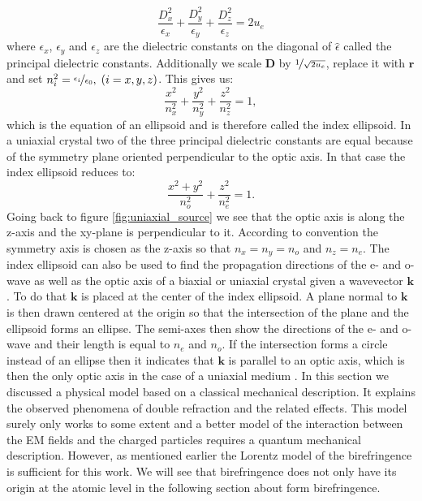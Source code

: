 \begin{equation}
    \frac{D_x^2}{\epsilon_x}+\frac{D_y^2}{\epsilon_y}+\frac{D_z^2}{\epsilon_z}= 2u_e
\end{equation}
where $\epsilon_x$, $\epsilon_y$ and $\epsilon_z$ are the dielectric constants on the diagonal of $\hat{\epsilon}$ called the principal dielectric constants. Additionally we scale $\bm{D}$ by $\nicefrac{1}{\sqrt{2u_e}}$, replace it with $\bm{r}$ and set $n_i^2 = \nicefrac{\epsilon_i}{\epsilon_0},\; (i=x,y,z)$. This gives us:
\begin{equation}
    \frac{x^2}{n_x^2}+\frac{y^2}{n_y^2}+\frac{z^2}{n_z^2}=1,
\end{equation}
which is the equation of an ellipsoid and is therefore called the index ellipsoid. In a uniaxial crystal two of the three principal dielectric constants are equal because of the symmetry plane oriented perpendicular to the optic axis. In that case the index ellipsoid reduces to:
\begin{equation}
    \label{eq:negative_index_ellipsod}
    \frac{x^2+y^2}{n_o^2}+\frac{z^2}{n_e^2}=1.
\end{equation}
Going back to figure \ref{fig:uniaxial_source} we see that the optic axis is along the z-axis and the xy-plane is perpendicular to it. According to convention the symmetry axis is chosen as the z-axis so that $n_x=n_y=n_o$ and $n_z=n_e$. The index ellipsoid can also be used to find the propagation directions of the e- and o-wave as well as the optic axis of a biaxial or uniaxial crystal given a wavevector $\bm{k}$. To do that $\bm{k}$ is placed at the center of the index ellipsoid. A plane normal to $\bm{k}$ is then drawn centered at the origin so that the intersection of the plane and the ellipsoid forms an ellipse. The semi-axes then show the directions of the e- and o-wave and their length is equal to $n_e$ and $n_o$. If the intersection forms a circle instead of an ellipse then it indicates that $\bm{k}$ is parallel to an optic axis, which is then the only optic axis in the case of a uniaxial medium \cite{Yariv1984, Griffiths2017}. 
In this section we discussed a physical model based on a classical mechanical description. It explains the observed phenomena of double refraction and the related effects. This model surely only works to some extent and a better model of the interaction between the EM fields and the charged particles requires a quantum mechanical description. However, as mentioned earlier the Lorentz model of the birefringence is sufficient for this work. We will see that birefringence does not only have its origin at the atomic level in the following section about form birefringence. 

